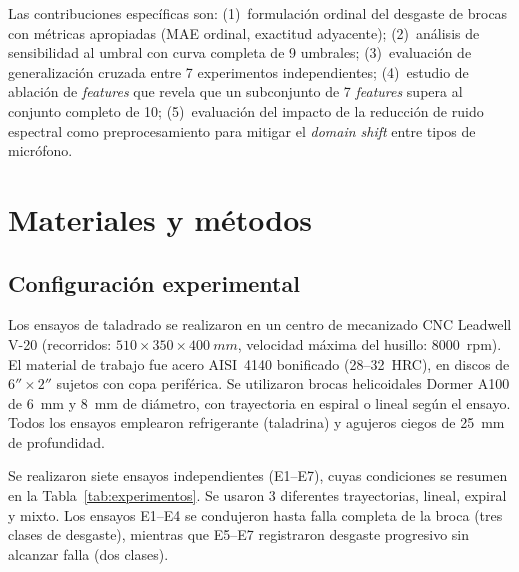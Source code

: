 \documentclass[10pt,twocolumn]{article}
\begin{document}
Las contribuciones específicas son: (1)~formulación ordinal del desgaste de
brocas con métricas apropiadas (MAE ordinal, exactitud adyacente);
(2)~análisis de sensibilidad al umbral con curva completa de 9 umbrales;
(3)~evaluación de generalización cruzada entre 7 experimentos independientes;
(4)~estudio de ablación de \textit{features} que revela que un subconjunto
de 7 \textit{features} supera al conjunto completo de 10;
(5)~evaluación del impacto de la reducción de ruido espectral como
preprocesamiento para mitigar el \textit{domain shift} entre tipos de
micrófono.

\section{Materiales y métodos}
\label{sec:metodos}

\subsection{Configuración experimental}

Los ensayos de taladrado se realizaron en un centro de mecanizado CNC
Leadwell V-20 (recorridos: $510 \times 350 \times \SI{400}{mm}$,
velocidad máxima del husillo: \SI{8000}{rpm}). El material de trabajo fue
acero AISI~4140 bonificado (28--32~HRC), en discos de $6'' \times 2''$
sujetos con copa periférica. Se utilizaron brocas helicoidales Dormer A100
de \SI{6}{mm} y \SI{8}{mm} de diámetro, con trayectoria en espiral o
lineal según el ensayo. Todos los ensayos emplearon refrigerante
(taladrina) y agujeros ciegos de \SI{25}{mm} de profundidad.

Se realizaron siete ensayos independientes (E1--E7), cuyas condiciones se
resumen en la Tabla~\ref{tab:experimentos}. Se usaron 3 diferentes trayectorias,
lineal, expiral y mixto. Los ensayos E1--E4 se
condujeron hasta falla completa de la broca (tres clases de desgaste),
mientras que E5--E7 registraron desgaste progresivo sin alcanzar falla
(dos clases).
\end{document}
